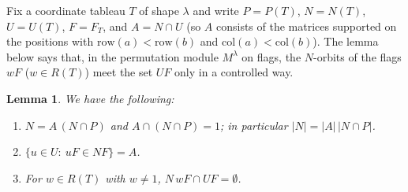 \documentclass[11pt, letterpaper]{amsart}
\newtheorem{lemma}{Lemma}
\theoremstyle{definition}
\theoremstyle{remark}
\newcommand{\row}{\mathrm{row}}
\newcommand{\col}{\mathrm{col}}
\begin{document}
Fix a coordinate tableau $T$ of shape $\lambda$ and write $P=P(T)$, $N=N(T)$, $U=U(T)$, $F=F_T$, and $A=N\cap U$ (so $A$ consists of the matrices supported on the positions with $\row(a)<\row(b)$ and $\col(a)<\col(b)$). The lemma below says that, in the permutation module $M^\lambda$ on flags, the $N$-orbits of the flags $wF$ ($w\in R(T)$) meet the set $UF$ only in a controlled way.

\begin{lemma}\label{lemorbits}
We have the following:
\begin{enumerate}
\item[(a)] $N=A\,(N\cap P)$ and $A\cap(N\cap P)=1$; in particular $|N|=|A|\,|N\cap P|$.
\item[(b)] $\{u\in U:\ uF\in NF\}=A$.
\item[(c)] For $w\in R(T)$ with $w\ne1$, $N\,wF\cap UF=\emptyset$.
\end{enumerate}
\end{lemma}
\end{document}
